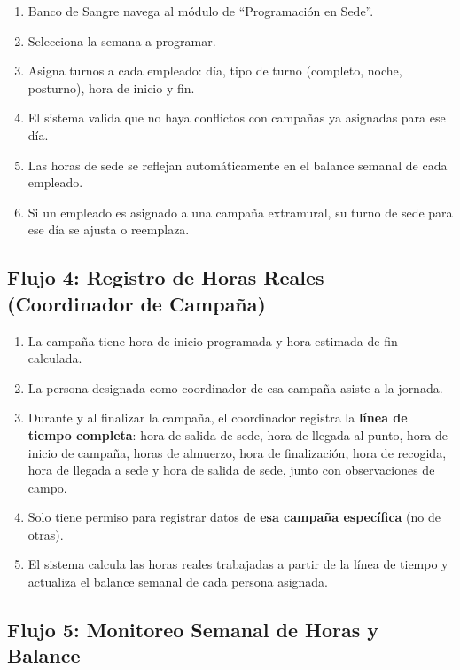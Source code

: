 \documentclass[10pt,a4paper]{article}
\begin{document}
\begin{enumerate}[leftmargin=2em]
    \item Banco de Sangre navega al m\'{o}dulo de ``Programaci\'{o}n en Sede''.
    \item Selecciona la semana a programar.
    \item Asigna turnos a cada empleado: d\'{i}a, tipo de turno (completo, noche, posturno), hora de inicio y fin.
    \item El sistema valida que no haya conflictos con campañas ya asignadas para ese d\'{i}a.
    \item Las horas de sede se reflejan autom\'{a}ticamente en el balance semanal de cada empleado.
    \item Si un empleado es asignado a una campaña extramural, su turno de sede para ese d\'{i}a se ajusta o reemplaza.
\end{enumerate}

\subsection{Flujo 4: Registro de Horas Reales (Coordinador de Campaña)}

\begin{enumerate}[leftmargin=2em]
    \item La campaña tiene hora de inicio programada y hora estimada de fin calculada.
    \item La persona designada como coordinador de esa campaña asiste a la jornada.
    \item Durante y al finalizar la campaña, el coordinador registra la \textbf{l\'{i}nea de tiempo completa}: hora de salida de sede, hora de llegada al punto, hora de inicio de campaña, horas de almuerzo, hora de finalizaci\'{o}n, hora de recogida, hora de llegada a sede y hora de salida de sede, junto con observaciones de campo.
    \item Solo tiene permiso para registrar datos de \textbf{esa campaña espec\'{i}fica} (no de otras).
    \item El sistema calcula las horas reales trabajadas a partir de la l\'{i}nea de tiempo y actualiza el balance semanal de cada persona asignada.
\end{enumerate}

\subsection{Flujo 5: Monitoreo Semanal de Horas y Balance}
\end{document}
